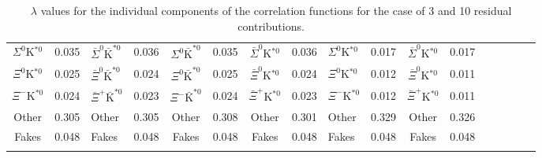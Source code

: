 \begin{landscape}
\begin{table}[htbp]
{\begin{tabular}{|c|cV{5.0}c|cV{5.0}c|cV{5.0}c|cV{5.0}c|cV{5.0}c|c|}
  $\Sigma^{0}$K$^{*0}$ & 0.035 & $\bar{\Sigma}^{0}\bar{\mathrm{K}}^{*0}$ & 0.036 & $\Sigma^{0}\bar{\mathrm{K}}^{*0}$ & 0.035 & $\bar{\Sigma}^{0}$K$^{*0}$ & 0.036 & $\Sigma^{0}$K$^{*0}$ & 0.017 & $\bar{\Sigma}^{0}$K$^{*0}$ & 0.017 \\
  
  $\Xi^{0}$K$^{*0}$ & 0.025 & $\bar{\Xi}^{0}\bar{\mathrm{K}}^{*0}$ & 0.024 & $\Xi^{0}\bar{\mathrm{K}}^{*0}$ & 0.025 & $\bar{\Xi}^{0}$K$^{*0}$ & 0.024 & $\Xi^{0}$K$^{*0}$ & 0.012 & $\bar{\Xi}^{0}$K$^{*0}$ & 0.011 \\
  
  $\Xi^{-}$K$^{*0}$ & 0.024 & $\bar{\Xi}^{+}\bar{\mathrm{K}}^{*0}$ & 0.023 & $\Xi^{-}\bar{\mathrm{K}}^{*0}$ & 0.024 & $\bar{\Xi}^{+}$K$^{*0}$ & 0.023 & $\Xi^{-}$K$^{*0}$ & 0.012 & $\bar{\Xi}^{+}$K$^{*0}$ & 0.011 \\
  
  Other & 0.305 & Other & 0.305 & Other & 0.308 & Other & 0.301 & Other & 0.329 & Other & 0.326 \\
  
  Fakes & 0.048 & Fakes & 0.048 & Fakes & 0.048 & Fakes & 0.048 & Fakes & 0.048 & Fakes & 0.048 \\
  
 \end{tabular}}
 \caption{$\lambda$ values for the individual components of the \LamK correlation functions for the case of 3 and 10 residual contributions.}
 \label{tab:LambdaValues_All}
\end{table}

\end{landscape}
\pagestyle{plain}



